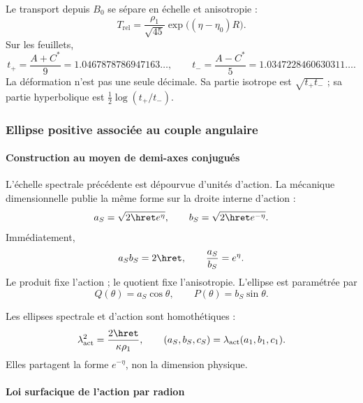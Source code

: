 Le transport depuis \(B_0\) se sépare en échelle et anisotropie :
\begin{equation}
T_{\mathrm{rel}}=\frac{\rho_1}{\sqrt{45}}
\exp\bigl((\eta-\eta_0)R\bigr).
\label{eq:transporte-rel}
\end{equation}
Sur les feuillets,
\[
t_+=\frac{A+C^*}{9}=1.0467878786947163\ldots,
\qquad
t_-=\frac{A-C^*}{5}=1.0347228460630311\ldots.
\]
La déformation n'est pas une seule décimale. Sa partie isotrope est
\(\sqrt{t_+t_-}\) ; sa partie hyperbolique est
\(\tfrac12\log(t_+/t_-)\).

\subsubsection{Ellipse positive associée au couple angulaire}

\paragraph{Construction au moyen de demi-axes conjugués}

L'échelle spectrale précédente est dépourvue d'unités d'action. La mécanique
dimensionnelle publie la même forme sur la droite interne d'action :
\begin{equation}
a_S=\sqrt{2\hret e^\eta},
\qquad
b_S=\sqrt{2\hret e^{-\eta}}.
\label{eq:semiejes-accion}
\end{equation}
Immédiatement,
\begin{equation}
a_Sb_S=2\hret,\qquad
\frac{a_S}{b_S}=e^\eta.
\label{eq:producto-forma}
\end{equation}
Le produit fixe l'action ; le quotient fixe l'anisotropie. L'ellipse est
paramétrée par
\begin{equation}
Q(\theta)=a_S\cos\theta,\qquad
P(\theta)=b_S\sin\theta.
\label{eq:elipse-param}
\end{equation}

Les ellipses spectrale et d'action sont homothétiques :
\begin{equation}
\lambda_{\mathrm{act}}^2=\frac{2\hret}{\kappa\rho_1},
\qquad
(a_S,b_S,c_S)=\lambda_{\mathrm{act}}(a_1,b_1,c_1).
\label{eq:homotecia}
\end{equation}
Elles partagent la forme \(e^{-\eta}\), non la dimension physique.

\paragraph{Loi surfacique de l'action par radion}


